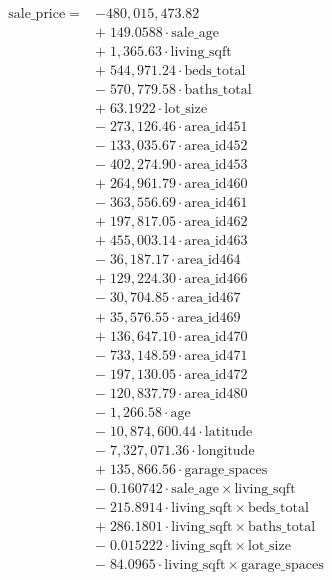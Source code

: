 \documentclass[
]{article}
\begin{document}
\[
 \begin{array}{rl}
\text{sale_price} \;=\; & -480,015,473.82 \\
& + \; 149.0588 \cdot \text{sale_age} \\
& + \; 1,365.63 \cdot \text{living_sqft} \\
& + \; 544,971.24 \cdot \text{beds_total} \\
& - \; 570,779.58 \cdot \text{baths_total} \\
& + \; 63.1922 \cdot \text{lot_size} \\
& - \; 273,126.46 \cdot \text{area_id451} \\
& - \; 133,035.67 \cdot \text{area_id452} \\
& - \; 402,274.90 \cdot \text{area_id453} \\
& + \; 264,961.79 \cdot \text{area_id460} \\
& - \; 363,556.69 \cdot \text{area_id461} \\
& + \; 197,817.05 \cdot \text{area_id462} \\
& + \; 455,003.14 \cdot \text{area_id463} \\
& - \; 36,187.17 \cdot \text{area_id464} \\
& + \; 129,224.30 \cdot \text{area_id466} \\
& - \; 30,704.85 \cdot \text{area_id467} \\
& + \; 35,576.55 \cdot \text{area_id469} \\
& + \; 136,647.10 \cdot \text{area_id470} \\
& - \; 733,148.59 \cdot \text{area_id471} \\
& - \; 197,130.05 \cdot \text{area_id472} \\
& - \; 120,837.79 \cdot \text{area_id480} \\
& - \; 1,266.58 \cdot \text{age} \\
& - \; 10,874,600.44 \cdot \text{latitude} \\
& - \; 7,327,071.36 \cdot \text{longitude} \\
& + \; 135,866.56 \cdot \text{garage_spaces} \\
& - \; 0.160742 \cdot \text{sale_age} \times \text{living_sqft} \\
& - \; 215.8914 \cdot \text{living_sqft} \times \text{beds_total} \\
& + \; 286.1801 \cdot \text{living_sqft} \times \text{baths_total} \\
& - \; 0.015222 \cdot \text{living_sqft} \times \text{lot_size} \\
& - \; 84.0965 \cdot \text{living_sqft} \times \text{garage_spaces}
\end{array} 
\]
\end{document}
